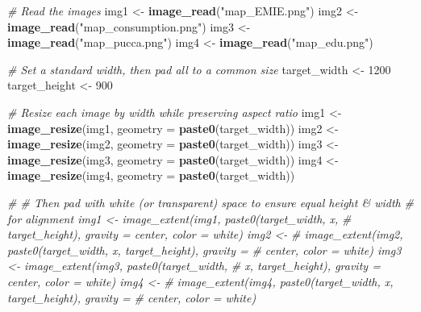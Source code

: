 \documentclass[
]{article}
\newenvironment{Shaded}{\begin{snugshade}}{\end{snugshade}}
\newcommand{\AttributeTok}[1]{\textcolor[rgb]{0.13,0.29,0.53}{#1}}
\newcommand{\CommentTok}[1]{\textcolor[rgb]{0.56,0.35,0.01}{\textit{#1}}}
\newcommand{\DecValTok}[1]{\textcolor[rgb]{0.00,0.00,0.81}{#1}}
\newcommand{\FunctionTok}[1]{\textcolor[rgb]{0.13,0.29,0.53}{\textbf{#1}}}
\newcommand{\NormalTok}[1]{#1}
\newcommand{\OtherTok}[1]{\textcolor[rgb]{0.56,0.35,0.01}{#1}}
\newcommand{\StringTok}[1]{\textcolor[rgb]{0.31,0.60,0.02}{#1}}
\begin{document}
\begin{Shaded}
\begin{Highlighting}[]
\CommentTok{\# Read the images}
\NormalTok{img1 }\OtherTok{\textless{}{-}} \FunctionTok{image\_read}\NormalTok{(}\StringTok{"map\_EMIE.png"}\NormalTok{)}
\NormalTok{img2 }\OtherTok{\textless{}{-}} \FunctionTok{image\_read}\NormalTok{(}\StringTok{"map\_consumption.png"}\NormalTok{)}
\NormalTok{img3 }\OtherTok{\textless{}{-}} \FunctionTok{image\_read}\NormalTok{(}\StringTok{"map\_pucca.png"}\NormalTok{)}
\NormalTok{img4 }\OtherTok{\textless{}{-}} \FunctionTok{image\_read}\NormalTok{(}\StringTok{"map\_edu.png"}\NormalTok{)}

\CommentTok{\# Set a standard width, then pad all to a common size}
\NormalTok{target\_width }\OtherTok{\textless{}{-}} \DecValTok{1200}
\NormalTok{target\_height }\OtherTok{\textless{}{-}} \DecValTok{900}

\CommentTok{\# Resize each image by width while preserving aspect ratio}
\NormalTok{img1 }\OtherTok{\textless{}{-}} \FunctionTok{image\_resize}\NormalTok{(img1, }\AttributeTok{geometry =} \FunctionTok{paste0}\NormalTok{(target\_width))}
\NormalTok{img2 }\OtherTok{\textless{}{-}} \FunctionTok{image\_resize}\NormalTok{(img2, }\AttributeTok{geometry =} \FunctionTok{paste0}\NormalTok{(target\_width))}
\NormalTok{img3 }\OtherTok{\textless{}{-}} \FunctionTok{image\_resize}\NormalTok{(img3, }\AttributeTok{geometry =} \FunctionTok{paste0}\NormalTok{(target\_width))}
\NormalTok{img4 }\OtherTok{\textless{}{-}} \FunctionTok{image\_resize}\NormalTok{(img4, }\AttributeTok{geometry =} \FunctionTok{paste0}\NormalTok{(target\_width))}

\CommentTok{\# \# Then pad with white (or transparent) space to ensure equal height \& width}
\CommentTok{\# for alignment img1 \textless{}{-} image\_extent(img1, paste0(target\_width, \textquotesingle{}x\textquotesingle{},}
\CommentTok{\# target\_height), gravity = \textquotesingle{}center\textquotesingle{}, color = \textquotesingle{}white\textquotesingle{}) img2 \textless{}{-}}
\CommentTok{\# image\_extent(img2, paste0(target\_width, \textquotesingle{}x\textquotesingle{}, target\_height), gravity =}
\CommentTok{\# \textquotesingle{}center\textquotesingle{}, color = \textquotesingle{}white\textquotesingle{}) img3 \textless{}{-} image\_extent(img3, paste0(target\_width,}
\CommentTok{\# \textquotesingle{}x\textquotesingle{}, target\_height), gravity = \textquotesingle{}center\textquotesingle{}, color = \textquotesingle{}white\textquotesingle{}) img4 \textless{}{-}}
\CommentTok{\# image\_extent(img4, paste0(target\_width, \textquotesingle{}x\textquotesingle{}, target\_height), gravity =}
\CommentTok{\# \textquotesingle{}center\textquotesingle{}, color = \textquotesingle{}white\textquotesingle{})}


\end{Highlighting}
\end{Shaded}
\end{document}
